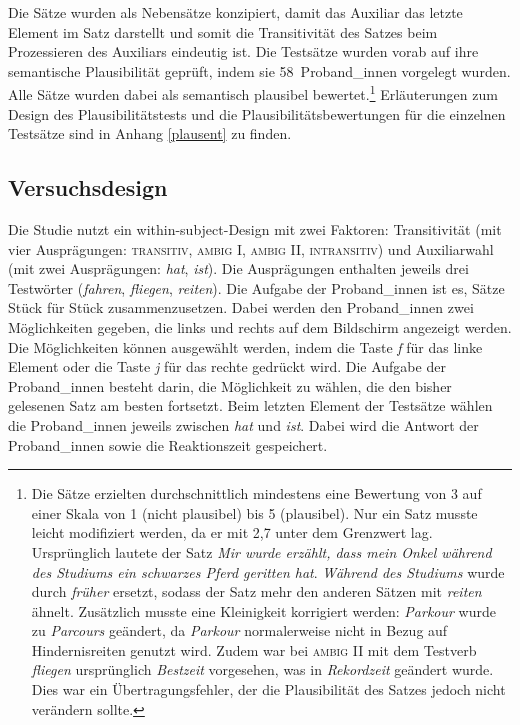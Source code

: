 Die Sätze wurden als Nebensätze konzipiert, damit das Auxiliar das letzte Element im Satz darstellt und somit die Transitivität des Satzes beim Prozessieren des Auxiliars eindeutig ist. Die Testsätze wurden vorab auf ihre semantische Plausibilität geprüft, indem sie 58~Proband\_innen vorgelegt wurden. Alle Sätze wurden dabei als semantisch plausibel bewertet.\footnote{Die Sätze erzielten durchschnittlich mindestens eine Bewertung von 3 auf einer Skala von 1 (nicht plausibel) bis 5 (plausibel). Nur ein Satz musste leicht modifiziert werden, da er mit 2,7 unter dem Grenzwert lag. Ursprünglich lautete der Satz \textit{Mir wurde erzählt, dass mein Onkel während des Studiums ein schwarzes Pferd geritten hat}. \textit{Während des Studiums} wurde durch \textit {früher} ersetzt, sodass der Satz mehr den anderen Sätzen mit \textit{reiten} ähnelt. Zusätzlich musste eine Kleinigkeit korrigiert werden: \textit{Parkour} wurde zu \textit{Parcours} geändert, da \textit{Parkour} normalerweise nicht in Bezug auf Hindernisreiten genutzt wird. Zudem war bei \textsc{ambig II} mit dem Testverb \textit{fliegen} ursprünglich \textit{Bestzeit} vorgesehen, was in \textit{Rekordzeit} geändert wurde. Dies war ein Übertragungsfehler, der die Plausibilität des Satzes jedoch nicht verändern sollte.} Erläuterungen zum Design des Plausibilitätstests und die Plausibilitätsbewertungen für die einzelnen Testsätze sind in Anhang \ref{plausent} zu finden.

\subsection{Versuchsdesign}\label{studieprotodesign}

Die Studie nutzt ein within-subject-Design mit zwei Faktoren: Transitivität (mit vier Ausprägungen: \textsc{transitiv}, \textsc{ambig I}, \textsc{ambig II}, \textsc{intransitiv}) und Auxiliarwahl (mit zwei Ausprägungen: \textit{hat}, \textit{ist}). Die Ausprägungen enthalten jeweils drei Testwörter (\textit{fahren}, \textit{fliegen}, \textit{reiten}). Die Aufgabe der Proband\_innen ist es, Sätze Stück für Stück zusammenzusetzen. Dabei werden den Proband\_innen zwei Möglichkeiten gegeben, die links und rechts auf dem Bildschirm angezeigt werden. Die Möglichkeiten können ausgewählt werden, indem die Taste \textit{f} für das linke Element oder die Taste \textit{j} für das rechte gedrückt wird. Die Aufgabe der Pro\-\mbox{band\_in}\-nen besteht darin, die Möglichkeit zu wählen, die den bisher gelesenen Satz am besten fortsetzt. Beim letzten Element der Testsätze wählen die Proband\_innen jeweils zwischen \textit{hat} und \textit{ist}. Dabei wird die Antwort der Proband\_innen sowie die Reaktionszeit gespeichert.


